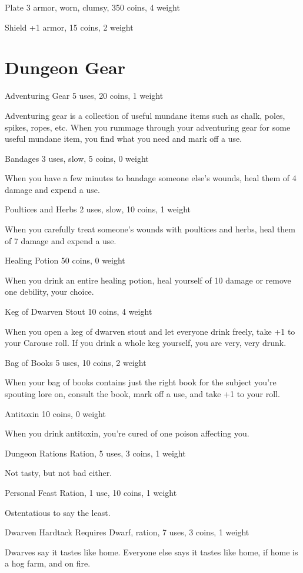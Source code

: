  Plate 3 armor, worn, clumsy, 350 coins, 4 weight


 Shield +1 armor, 15 coins, 2 weight
\section{Dungeon Gear}


 Adventuring Gear 5 uses, 20 coins, 1 weight


 Adventuring gear is a collection of useful mundane items such as chalk, poles, spikes, ropes, etc. When you rummage through your adventuring gear for some useful mundane item, you find what you need and mark off a use.


 Bandages 3 uses, slow, 5 coins, 0 weight


 When you have a few minutes to bandage someone else's wounds, heal them of 4 damage and expend a use.


 Poultices and Herbs 2 uses, slow, 10 coins, 1 weight


 When you carefully treat someone's wounds with poultices and herbs, heal them of 7 damage and expend a use.


 Healing Potion 50 coins, 0 weight


 When you drink an entire healing potion, heal yourself of 10 damage or remove one debility, your choice.


 Keg of Dwarven Stout 10 coins, 4 weight


 When you open a keg of dwarven stout and let everyone drink freely, take +1 to your Carouse roll. If you drink a whole keg yourself, you are very, very drunk.


 Bag of Books 5 uses, 10 coins, 2 weight


 When your bag of books contains just the right book for the subject you're spouting lore on, consult the book, mark off a use, and take +1 to your roll.


 Antitoxin 10 coins, 0 weight


 When you drink antitoxin, you're cured of one poison affecting you.


 Dungeon Rations Ration, 5 uses, 3 coins, 1 weight


 Not tasty, but not bad either.


 Personal Feast Ration, 1 use, 10 coins, 1 weight


 Ostentatious to say the least.


 Dwarven Hardtack Requires Dwarf, ration, 7 uses, 3 coins, 1 weight


 Dwarves say it tastes like home. Everyone else says it tastes like home, if home is a hog farm, and on fire.


